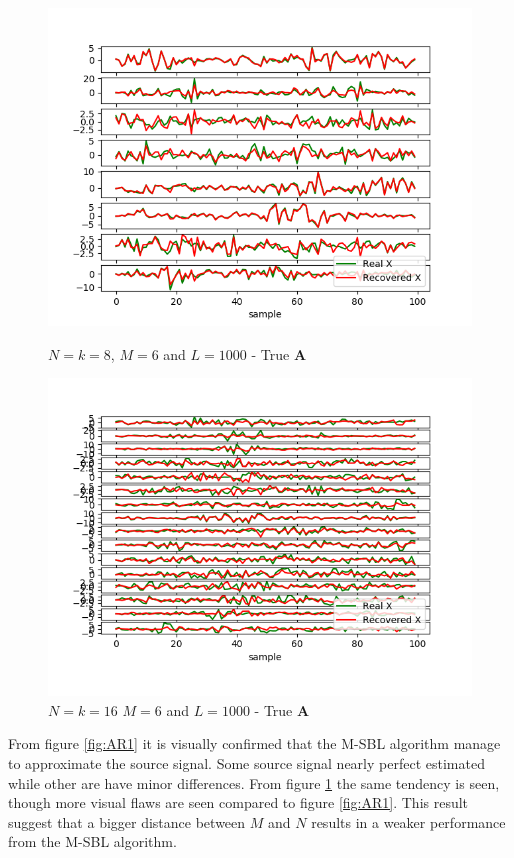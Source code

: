 \begin{figure}[H]
    \begin{minipage}[t]{.45\textwidth}
    	\centering
		\includegraphics[scale=0.5]{figures/ch_6/M-SBL_AR1.png}
		\caption{ $N=k=8$, $M = 6$ and $L=1000$  - True $\textbf{A}$}
		\label{fig:AR1}
    \end{minipage} 
    \hfill
    \begin{minipage}[t]{.45\textwidth}
        \centering
		\includegraphics[scale=0.5]{figures/ch_6/M-SBL_AR2.png}
		\caption{$N=k=16$ $M = 6$ and $L=1000$ - True $\textbf{A}$}
		\label{fig:AR2}
    \end{minipage}
\end{figure}
From figure \ref{fig:AR1} it is visually confirmed that the M-SBL algorithm manage to approximate the source signal. Some source signal nearly perfect estimated while other are have minor differences. From figure \ref{fig:AR2} the same tendency is seen, though more visual flaws are seen compared to figure \ref{fig:AR1}. This result suggest that a bigger distance between $M$ and $N$ results in a weaker performance from the M-SBL algorithm.        

% 






 
